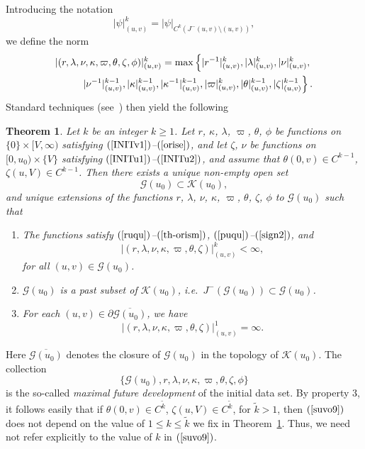 \documentclass{article}
\newtheorem{theorem}{Theorem}[section]
\begin{document}
Introducing the notation
\[
|\psi|^k_{(u,v)}=|\psi|_{C^k(J^-(u,v)\setminus(u,v))},
\]
we define the norm
\begin{eqnarray}
\label{normdef}
|(r,\lambda,\nu,\kappa,\varpi,\theta,\zeta, \phi)|^k_{(u,v)}
=\max\left\{|r^{-1}|^k_{(u,v)},|\lambda|^k_{(u,v)},|\nu|^k_{(u,v)},
\right.\\
\nonumber
\hbox{}\left.|\nu^{-1}|^{k-1}_{(u,v)},|\kappa|^{k-1}_{(u,v)}, |\kappa^{-1}|^{k-1}_{(u,v)},
|\varpi|^k_{(u,v)},|\theta|^{k-1}_{(u,v)},|\zeta|^{k-1}_{(u,v)}\right\}.
\end{eqnarray}
Standard techniques (see~\cite{chr:bv}) then yield the following 
\begin{theorem}
\label{standard}
Let $k$ be an integer $k\ge1$.
Let $r$, $\kappa$, $\lambda$, $\varpi$, $\theta$, $\phi$ be functions
on $\{0\}\times[V,\infty)$ satisfying $(\ref{INITv1})$--$(\ref{orise})$, and
let $\zeta$, $\nu$ be functions on $[0,u_0)\times\{V\}$
satisfying $(\ref{INITu1})$--$(\ref{INITu2})$, and assume that 
$\theta(0,v)\in C^{k-1}$, $\zeta(u,V)\in C^{k-1}$.
Then there exists a unique non-empty open set
\[
\mathcal{G}(u_0)\subset\mathcal{K}(u_0),
\]
and unique extensions of the functions
$r$, $\lambda$, $\nu$, $\kappa$, $\varpi$, $\theta$,
$\zeta$, $\phi$ to $\mathcal{G}(u_0)$
such that
\begin{enumerate}
\item
The functions satisfy $(\ref{ruqu})$--$(\ref{th-orism})$, 
$(\ref{puqu})$--$(\ref{sign2})$,
and 
\[
|(r,\lambda,\nu,\kappa,\varpi,\theta,\zeta)|^k_{(u,v)}<\infty,
\]
for all $(u,v)\in\mathcal{G}(u_0)$.
\item
$\mathcal{G}(u_0)$ is a past subset of $\mathcal{K}(u_0)$,
i.e.~$J^{-}(\mathcal{G}(u_0))\subset\mathcal{G}(u_0)$.
\item
For each $(u,v)\in\partial\overline{\mathcal{G}(u_0)}$,
we have
\[
|(r,\lambda,\nu,\kappa,\varpi,\theta,\zeta)|^1_{(u,v)}=\infty.
\]
\end{enumerate}
\end{theorem}
Here $\overline{\mathcal{G}(u_0)}$
denotes the closure of $\mathcal{G}(u_0)$ in the topology of $\mathcal{K}(u_0)$.
The collection
\begin{equation}
\label{suvo9}
\{\mathcal{G}(u_0), r, \lambda, \nu, \kappa, \varpi, \theta, \zeta, \phi\}
\end{equation}
is the so-called \emph{maximal future development} of the
initial data set. By property 3, it follows easily
that if $\theta(0,v)\in C^{\tilde{k}}$,
$\zeta(u,V)\in C^{\tilde{k}}$, for $\tilde{k}>1$, 
then $(\ref{suvo9})$ does not depend on
the value of $1\le k\le \tilde{k}$ we fix in Theorem~\ref{standard}. 
Thus, we need not refer explicitly to the value of $k$ in $(\ref{suvo9})$.
 
\end{document}
